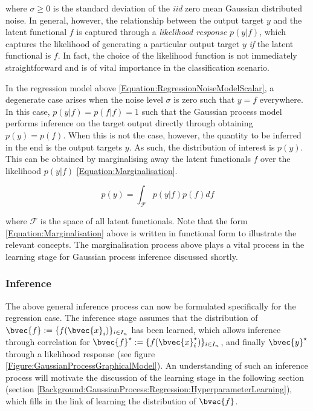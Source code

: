 				where $\sigma \geq 0$ is the standard deviation of the \textit{iid} zero mean Gaussian distributed noise. In general, however, the relationship between the output target $y$ and the latent functional $f$ is captured through a \textit{likelihood response} $p(y | f)$, which captures the likelihood of generating a particular output target $y$ \textit{if} the latent functional is $f$. In fact, the choice of the likelihood function is not immediately straightforward and is of vital importance in the classification scenario. 
				
				In the regression model above \eqref{Equation:RegressionNoiseModelScalar}, a degenerate case arises when the noise level $\sigma$ is zero such that $y = f$ everywhere. In this case, $p(y | f) = p(f | f) = 1$ such that the Gaussian process model performs inference on the target output directly through obtaining $p (y) = p(f)$. When this is not the case, however, the quantity to be inferred in the end is the output targets $y$. As such, the distribution of interest is $p(y)$. This can be obtained by marginalising away the latent functionals $f$ over the likelihood $p(y | f)$ \eqref{Equation:Marginalisation}.
				
				\begin{equation}
					p(y) = \int_{\mathscr{F}} p(y | f) p(f) df
				\label{Equation:Marginalisation}
				\end{equation}
				
				where $\mathscr{F}$ is the space of all latent functionals. Note that the form \eqref{Equation:Marginalisation} above is written in functional form to illustrate the relevant concepts. The marginalisation process above plays a vital process in the learning stage for Gaussian process inference discussed shortly.
		
			\subsubsection{Inference}
			\label{Background:GaussianProcess:Regression:Inference}
			
				The above general inference process can now be formulated specifically for the regression case. The inference stage assumes that the distribution of $\bvec{f} := \{f(\bvec{x}_{i})\}_{i \in I_{n}}$ has been learned, which allows inference through correlation for $\bvec{f}^{\star} := \{f(\bvec{x}^{\star}_{i})\}_{i \in I_{n}}$, and finally $\bvec{y}^{\star}$ through a likelihood response (see figure \ref{Figure:GaussianProcessGraphicalModel}). An understanding of such an inference process will motivate the discussion of the learning stage in the following section (section \ref{Background:GaussianProcess:Regression:HyperparameterLearning}), which fills in the link of learning the distribution of $\bvec{f}$.
				
